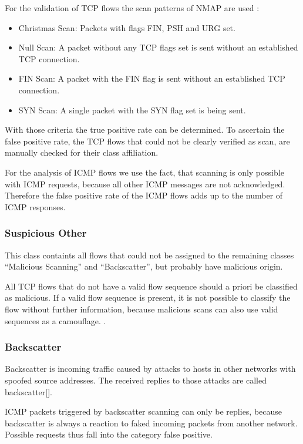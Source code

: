 \documentclass[a4paper]{scrartcl}
\begin{document}
For  the validation of TCP flows the scan patterns of NMAP are used \cite{nmap09}:
\begin{itemize}
	\item Christmas Scan:  Packets with flags FIN, PSH and URG set.
	\item Null Scan: A packet without any TCP flags set is sent without an established TCP connection. 
	\item FIN Scan: A packet with the FIN flag is sent without an established TCP connection.
	\item SYN Scan: A single packet with the SYN flag set is being sent.
\end{itemize}
With those criteria the true positive rate can be determined. 
To ascertain the false positive rate, the TCP flows that could not be clearly verified as scan, are manually checked for their class affiliation.

For the analysis of ICMP flows we use the fact, that scanning is only possible with ICMP requests, because all other ICMP messages are not acknowledged\cite{rfc_icmp}. Therefore the false positive rate of the ICMP flows adds up to the number of ICMP responses.

\subsubsection{Suspicious Other}
This class containts all flows that could not be assigned to the remaining classes ``Malicious Scanning'' and ``Backscatter'', but probably have malicious origin.

All TCP flows that do not have a valid flow sequence should a priori be classified as malicious. If a valid flow sequence is present, it is not possible to classify the flow without further information, because malicious scans can also use valid sequences as a camouflage. \cite{nmap09}.

\subsubsection{Backscatter}
Backscatter is incoming traffic caused by attacks to hosts in other networks with spoofed source addresses. The received replies to those attacks are called backscatter[]. 

ICMP packets triggered by backscatter scanning can only be replies, because backscatter is always a reaction to faked incoming packets from another network. Possible requests thus fall into the category false positive.
\end{document}
